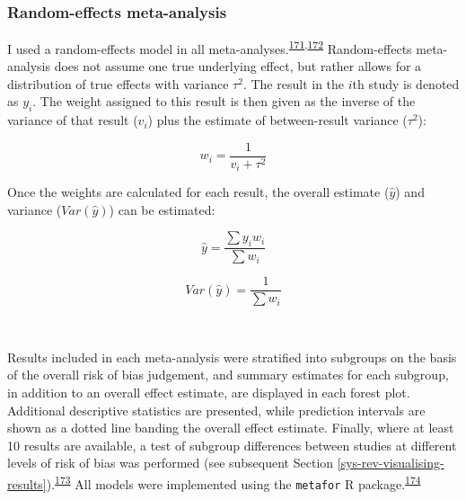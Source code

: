 \documentclass[a4paper, twoside]{templates/ociamthesis}
\begin{document}
~

\hypertarget{meta-analysis-methods}{%
\subsubsection{Random-effects meta-analysis}\label{meta-analysis-methods}}

I used a random-effects model in all meta-analyses.\textsuperscript{\protect\hyperlink{ref-hedges1998}{171},\protect\hyperlink{ref-dersimonian1986}{172}} Random-effects meta-analysis does not assume one true underlying effect, but rather allows for a distribution of true effects with variance \(\tau^2\). The result in the \(i\)th study is denoted as \(y_i\). The weight assigned to this result is then given as the inverse of the variance of that result (\(v_i\)) plus the estimate of between-result variance (\(\tau^2\)):

\begin{equation}
w_i = \frac{1}{v_i+\tau^2}
  \label{eq:ivweighting}
\end{equation}

Once the weights are calculated for each result, the overall estimate (\(\hat{y}\)) and variance (\(Var(\hat{y})\)) can be estimated:

\begin{equation}
\hat{y} = \frac{\sum{y_iw_i}}{\sum{w_i}}
  \label{eq:rmaEstimate}
\end{equation}

\begin{equation}
Var(\hat{y}) = \frac{1}{\sum{w_i}}
  \label{eq:rmaVariance}
\end{equation}

~

Results included in each meta-analysis were stratified into subgroups on the basis of the overall risk of bias judgement, and summary estimates for each subgroup, in addition to an overall effect estimate, are displayed in each forest plot. Additional descriptive statistics are presented, while prediction intervals are shown as a dotted line banding the overall effect estimate. Finally, where at least 10 results are available, a test of subgroup differences between studies at different levels of risk of bias was performed (see subsequent Section \ref{sys-rev-visualising-results}).\textsuperscript{\protect\hyperlink{ref-deeks2019}{173}} All models were implemented using the \texttt{metafor} R package.\textsuperscript{\protect\hyperlink{ref-R-metafor}{174}}

~
\end{document}
